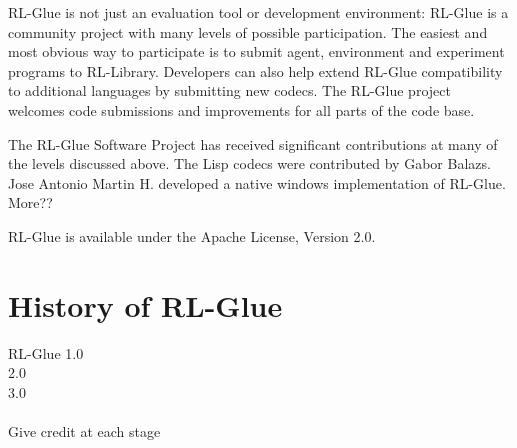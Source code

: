 \documentclass[twopage,11pt]{article}
\begin{document}
RL-Glue is not just an evaluation tool or development environment: RL-Glue is a community project with many levels of possible participation. The easiest and most obvious way to participate is to submit agent, environment and experiment programs to RL-Library. Developers can also help extend RL-Glue compatibility to additional languages by submitting new codecs. The RL-Glue project welcomes code submissions and improvements for all parts of the code base.   	

The RL-Glue Software Project has received significant contributions at many of the levels discussed above. The Lisp codecs were contributed by Gabor Balazs. Jose Antonio Martin H. developed a native windows implementation of RL-Glue. More??

RL-Glue is available under the Apache License, Version 2.0.
	

\section{History of RL-Glue}
RL-Glue 1.0\\
2.0\\
3.0
\\\\
Give credit at each stage
\end{document}
